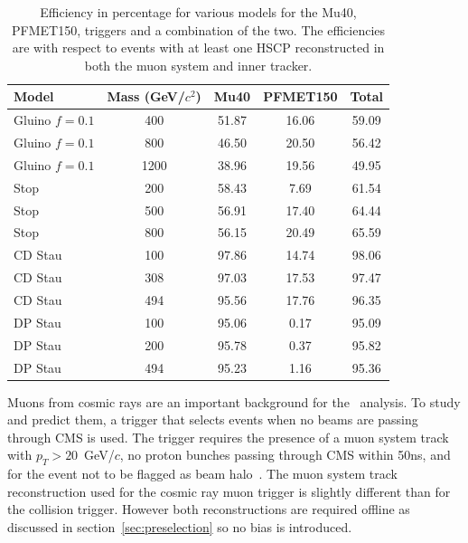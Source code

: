 \begin{table}
 \begin{center}
      \caption[Trigger efficiency for various models considered with respect to events with a reconstructed HSCP in both the muon system and inner tracker]
	      {Efficiency in percentage for various models for the Mu40, PFMET150, triggers and a combination of the two.
The efficiencies are with respect to events with at least one HSCP reconstructed in both the muon system and inner tracker.}
     \label{tab:triggEffGl}
  \begin{tabular}{|l|c|c|c|c|} \hline
      Model     & Mass (GeV/$c^2$) & Mu40       & PFMET150   & Total                 \\ \hline
 Gluino $f=0.1$ &  400       & 51.87      & 16.06      & 59.09    \\
 Gluino $f=0.1$ &  800       & 46.50      & 20.50      & 56.42    \\
 Gluino $f=0.1$ & 1200       & 38.96      & 19.56      & 49.95    \\
           Stop &  200       & 58.43      &  7.69      & 61.54    \\
           Stop &  500       & 56.91      & 17.40      & 64.44    \\
           Stop &  800       & 56.15      & 20.49      & 65.59    \\
        CD Stau &  100       & 97.86      & 14.74      & 98.06    \\
        CD Stau &  308       & 97.03      & 17.53      & 97.47    \\
        CD Stau &  494       & 95.56      & 17.76      & 96.35    \\
        DP Stau &  100       & 95.06      &  0.17      & 95.09    \\
        DP Stau &  200       & 95.78      &  0.37      & 95.82    \\
        DP Stau &  494       & 95.23      &  1.16      & 95.36    \\ \hline
  \end{tabular}
 \end{center}
\end{table}

Muons from cosmic rays are an important background for the \muononly\ analysis. To study and predict them, a trigger that selects events when no beams are passing through
CMS is used. The trigger requires the presence of a muon system track with $p_T > 20$~GeV/$c$, no proton bunches passing through CMS within 50ns,
and for the event not to be flagged as beam halo~\cite{wangler2000beam}.
The muon system track reconstruction used for the cosmic ray muon trigger is slightly different than for the collision trigger.
However both reconstructions are required offline as discussed in section~\ref{sec:preselection} so no bias is introduced.

